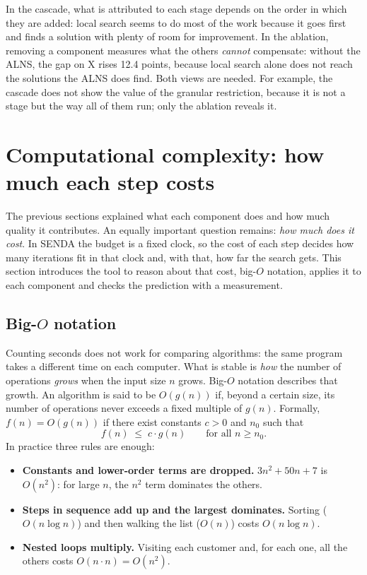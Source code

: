 \documentclass[11pt,a4paper]{article}
\begin{document}
\begin{leccion}
In the cascade, what is attributed to each stage depends on the order in which they are added: local
search seems to do most of the work because it goes first and finds a solution with plenty of room
for improvement. In the ablation, removing a component measures what the others \emph{cannot}
compensate: without the ALNS, the gap on X rises 12.4 points, because local search alone does not
reach the solutions the ALNS does find. Both views are needed. For example, the cascade does not show
the value of the granular restriction, because it is not a stage but the way all of them run; only
the ablation reveals it.
\end{leccion}

\section{Computational complexity: how much each step costs}
\label{sec:complejidad}

The previous sections explained what each component does and how much quality it contributes. An
equally important question remains: \emph{how much does it cost}. In SENDA the budget is a fixed
clock, so the cost of each step decides how many iterations fit in that clock and, with that, how far
the search gets. This section introduces the tool to reason about that cost, big-$O$ notation,
applies it to each component and checks the prediction with a measurement.

\subsection{Big-$O$ notation}

Counting seconds does not work for comparing algorithms: the same program takes a different time on
each computer. What is stable is \emph{how} the number of operations \emph{grows} when the input size
$n$ grows. Big-$O$ notation describes that growth. An algorithm is said to be $O(g(n))$ if, beyond a
certain size, its number of operations never exceeds a fixed multiple of $g(n)$. Formally,
$f(n)=O(g(n))$ if there exist constants $c>0$ and $n_0$ such that
\begin{equation}
f(n)\;\le\;c\cdot g(n)\qquad\text{for all } n\ge n_0 .
\end{equation}
In practice three rules are enough:
\begin{itemize}[leftmargin=1.5em]
\item \textbf{Constants and lower-order terms are dropped.} $3n^2+50n+7$ is $O(n^2)$: for large $n$,
the $n^2$ term dominates the others.
\item \textbf{Steps in sequence add up and the largest dominates.} Sorting ($O(n\log n)$) and then
walking the list ($O(n)$) costs $O(n\log n)$.
\item \textbf{Nested loops multiply.} Visiting each customer and, for each one, all the others costs
$O(n\cdot n)=O(n^2)$.
\end{itemize}
\end{document}

